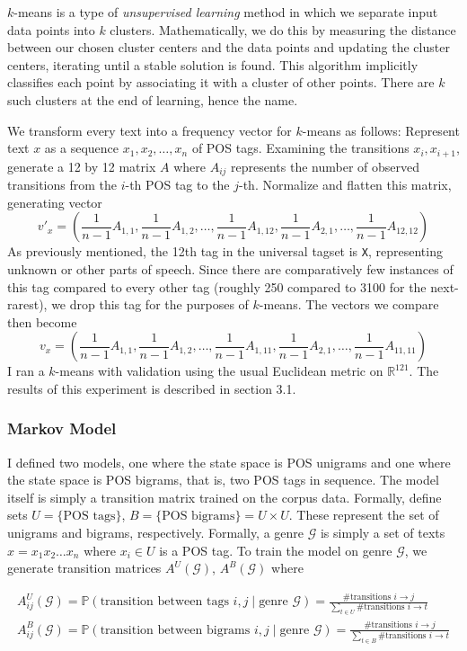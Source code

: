 \documentclass[12pt, titlepage]{article}
\begin{document}
$k$-means is a type of \textit{unsupervised learning} method in which we separate input data points into $k$ clusters. Mathematically, we do this by measuring the distance between our chosen cluster centers and the data points and updating the cluster centers, iterating until a stable solution is found. This algorithm implicitly classifies each point by associating it with a cluster of other points. There are $k$ such clusters at the end of learning, hence the name.

We transform every text into a frequency vector for $k$-means as follows: Represent text $x$ as a sequence $x_1, x_2, \dots, x_n$ of POS tags. Examining the transitions $x_i,x_{i+1}$, generate a 12 by 12 matrix $A$ where $A_{ij}$ represents the number of observed transitions from the $i$-th POS tag to the $j$-th. Normalize and flatten this matrix, generating vector
$$v'_x = (\frac{1}{n - 1}A_{1,1}, \frac{1}{n - 1}A_{1,2}, \dots, \frac{1}{n - 1}A_{1,12}, \frac{1}{n - 1}A_{2,1}, \dots, \frac{1}{n - 1}A_{12,12})$$
As previously mentioned, the 12th tag in the universal tagset is \verb|X|, representing unknown or other parts of speech. Since there are comparatively few instances of this tag compared to every other tag (roughly 250 compared to 3100 for the next-rarest), we drop this tag for the purposes of $k$-means. The vectors we compare then become
$$v_x = (\frac{1}{n - 1}A_{1,1}, \frac{1}{n - 1}A_{1,2}, \dots, \frac{1}{n - 1}A_{1,11}, \frac{1}{n - 1}A_{2,1}, \dots, \frac{1}{n - 1}A_{11,11})$$
I ran a $k$-means with validation using the usual Euclidean metric on $\mathbb{R}^{121}$. The results of this experiment is described in section 3.1.

\subsubsection{Markov Model}
I defined two models, one where the state space is POS unigrams and one where the state space is POS bigrams, that is, two POS tags in sequence. The model itself is simply a transition matrix trained on the corpus data. Formally, define sets $U = \{\text{POS tags}\}$, $B = \{\text{POS bigrams}\} = U \times U$. These represent the set of unigrams and bigrams, respectively. Formally, a genre $\mathcal{G}$ is simply a set of texts $x = x_1 x_2 \dots x_n$ where $x_i \in U$ is a POS tag. To train the model on genre $\mathcal{G}$, we generate transition matrices $A^U(\mathcal{G})$, $A^B(\mathcal{G})$ where

\begin{gather}
A^U_{ij}(\mathcal{G}) = \mathbb{P}(\text{transition between tags } i, j \;|\; \text{genre } \mathcal{G}) = \frac{\text{\# transitions } i \to j}{\underset{t \in U}{\sum}\text{\# transitions } i \to t}\\
A^B_{ij}(\mathcal{G}) = \mathbb{P}(\text{transition between bigrams } i, j \;|\; \text{genre } \mathcal{G}) = \frac{\text{\# transitions } i \to j}{\underset{t \in B}{\sum}\text{\# transitions } i \to t}
\end{gather}
\end{document}

